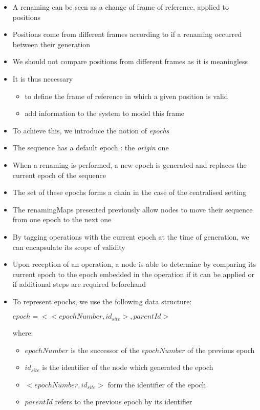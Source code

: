 \documentclass{article}
\begin{document}
\begin{itemize}
    \item A renaming can be seen as a change of frame of reference, applied to positions
    \item Positions come from different frames according to if a renaming occurred between their generation
    \item We should not compare positions from different frames as it is meaningless
    \item It is thus necessary
    \begin{itemize}
        \item to define the frame of reference in which a given position is valid
        \item add information to the system to model this frame
    \end{itemize}
    \item To achieve this, we introduce the notion of \emph{epochs}
    \item The sequence has a default epoch : the \emph{origin} one
    \item When a renaming is performed, a new epoch is generated and replaces the current epoch of the sequence
    \item The set of these epochs forms a chain in the case of the centralised setting
    \item The renamingMaps presented previously allow nodes to move their sequence from one epoch to the next one
    \item By tagging operations with the current epoch at the time of generation, we can encapsulate its scope of validity
    \item Upon reception of an operation, a node is able to determine by comparing its current epoch to the epoch embedded in the operation if it can be applied or if additional steps are required beforehand
    \item To represent epochs, we use the following data structure:

    \begin{center}
        $epoch = <<epochNumber, id_{site}>, parentId>$
    \end{center}

    where:

    \begin{itemize}
        \item $epochNumber$ is the successor of the $epochNumber$ of the previous epoch
        \item $id_{site}$ is the identifier of the node which generated the epoch
        \item $<epochNumber, id_{site}>$ form the identifier of the epoch
        \item $parentId$ refers to the previous epoch by its identifier
    \end{itemize}
\end{itemize}
\end{document}
